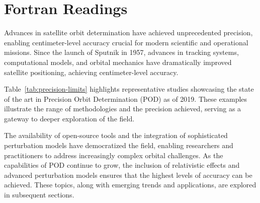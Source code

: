 % 

\section{Fortran Readings}
Advances in satellite orbit determination have achieved unprecedented precision, enabling centimeter-level accuracy crucial for modern scientific and operational missions. Since the launch of Sputnik in 1957, advances in tracking systems, computational models, and orbital mechanics have dramatically improved satellite positioning, achieving centimeter-level accuracy.

Table~\ref{tab:precision-limits} highlights representative studies showcasing the state of the art in Precision Orbit Determination (POD) as of 2019. These examples illustrate the range of methodologies and the precision achieved, serving as a gateway to deeper exploration of the field.

The availability of open-source tools and the integration of sophisticated perturbation models have democratized the field, enabling researchers and practitioners to address increasingly complex orbital challenges. As the capabilities of POD continue to grow, the inclusion of relativistic effects and advanced perturbation models ensures that the highest levels of accuracy can be achieved. These topics, along with emerging trends and applications, are explored in subsequent sections. 

\endinput  %
